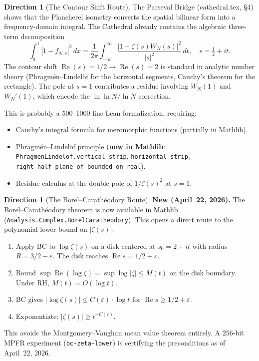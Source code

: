 \documentclass[11pt,a4paper]{article}
\theoremstyle{definition}
\newtheorem{direction}[definition]{Direction}
\newcommand{\re}{\operatorname{Re}}
\newcommand{\lean}[1]{\texttt{#1}}
\begin{document}
\begin{direction}[The Contour Shift Route]
The Parseval Bridge (cathedral.tex, \S4) shows that the Plancherel
isometry converts the spatial bilinear form into a frequency-domain
integral. The Cathedral already contains the algebraic three-term
decomposition
\[
  \int_0^1 |1 - f_{N,v}|^2\,dx
  = \frac{1}{2\pi}\int_{-\infty}^{\infty}
    \frac{|1 - \zeta(s)W_N(s)|^2}{|s|^2}\,dt,
    \quad s = \tfrac{1}{2}+it.
\]
The contour shift $\re(s) = 1/2 \to \re(s) = 2$ is standard in analytic
number theory (Phragm\'en--Lindel\"of for the horizontal segments,
Cauchy's theorem for the rectangle). The pole at $s = 1$ contributes
a residue involving $W_N(1)$ and $W_N'(1)$, which encode the
$\ln\ln N/\ln N$ correction.

This is probably a 500--1000 line Lean formalization, requiring:
\begin{itemize}
  \item Cauchy's integral formula for meromorphic functions (partially in Mathlib).
  \item Phragm\'en--Lindel\"of principle (\textbf{now in Mathlib}:
    \lean{PhragmenLindelof.vertical\_strip}, \lean{horizontal\_strip},
    \lean{right\_half\_plane\_of\_bounded\_on\_real}).
  \item Residue calculus at the double pole of $1/\zeta(s)^2$ at $s = 1$.
\end{itemize}
\end{direction}

\begin{direction}[The Borel--Carath\'eodory Route]
\textbf{New (April~22, 2026).} The Borel--Carath\'eodory theorem is now
available in Mathlib (\texttt{Analysis.Complex.BorelCaratheodory}). This
opens a direct route to the polynomial lower bound on $|\zeta(s)|$:
\begin{enumerate}
  \item Apply BC to $\log\zeta(s)$ on a disk centered at $s_0 = 2+it$
    with radius $R = 3/2 - \varepsilon$. The disk reaches $\re s = 1/2 + \varepsilon$.
  \item Bound $\sup \re(\log\zeta) = \sup \log|\zeta| \leq M(t)$ on the
    disk boundary. Under RH, $M(t) = O(\log t)$.
  \item BC gives $|\log\zeta(s)| \leq C(\varepsilon) \cdot \log t$
    for $\re s \geq 1/2 + \varepsilon$.
  \item Exponentiate: $|\zeta(s)| \geq t^{-C(\varepsilon)}$.
\end{enumerate}
This avoids the Montgomery--Vaughan mean value theorem entirely.
A 256-bit MPFR experiment (\texttt{bc-zeta-lower}) is certifying the
preconditions as of April~22, 2026.
\end{direction}
\end{document}
